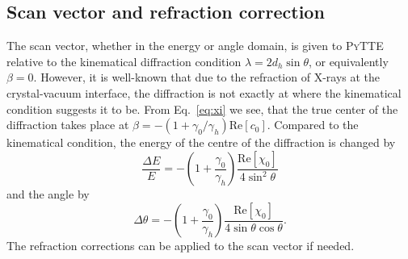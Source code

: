 \documentclass[11pt,a4paper]{article}
\begin{document}
\subsection{Scan vector and refraction correction}
The scan vector, whether in the energy or angle domain, is given to \textsc{PyTTE} relative to the kinematical diffraction condition $\lambda = 2 d_h \sin \theta$, or equivalently $\beta = 0$. 
However, it is well-known \cite{Ewald_1986} that due to the refraction of X-rays at the crystal-vacuum interface, the diffraction is not exactly at where the kinematical condition suggests it to be. From Eq.~\eqref{eq:xi} we see, that the true center of the diffraction takes place at $\beta = -(1 + \gamma_0/\gamma_h)\mathrm{Re}[c_0]$. Compared to the kinematical condition, the energy of the centre of the diffraction is changed by
\begin{equation}
\frac{\Delta E}{E} = -\left(1 + \frac{\gamma_0}{\gamma_h} \right)\frac{\mathrm{Re}[\chi_0]}{4 \sin^2 \theta}
\end{equation}
and the angle by
\begin{equation} 
\Delta \theta = -\left(1 + \frac{\gamma_0}{\gamma_h} \right)\frac{\mathrm{Re}[\chi_0]}{4 \sin \theta  \cos \theta}.
\end{equation}
The refraction corrections can be applied to the scan vector if needed.
\end{document}
